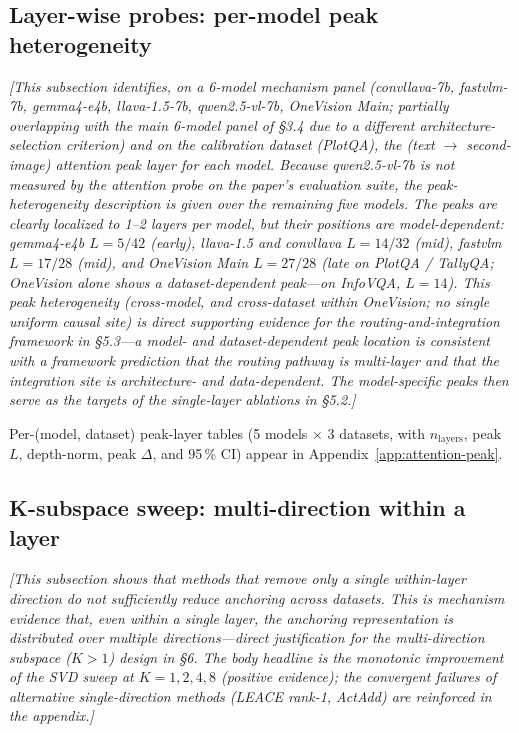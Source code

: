 \documentclass[11pt]{article}
\newcommand{\todoNote}[1]{\textit{\textcolor[rgb]{0.45,0.45,0.45}{[#1]}}}
\begin{document}
\subsection{Layer-wise probes: per-model peak heterogeneity}
\label{sec:layer-probes}
\todoNote{This subsection identifies, on a 6-model mechanism panel (convllava-7b, fastvlm-7b, gemma4-e4b, llava-1.5-7b, qwen2.5-vl-7b, OneVision Main; partially overlapping with the main 6-model panel of \S3.4 due to a different architecture-selection criterion) and on the calibration dataset (PlotQA), the (text $\rightarrow$ second-image) attention peak layer for each model. Because qwen2.5-vl-7b is not measured by the attention probe on the paper's evaluation suite, the peak-heterogeneity description is given over the remaining five models. The peaks are \textit{clearly localized to 1--2 layers per model, but their positions are model-dependent}: gemma4-e4b $L=5/42$ (early), llava-1.5 and convllava $L=14/32$ (mid), fastvlm $L=17/28$ (mid), and OneVision Main $L=27/28$ (late on PlotQA / TallyQA; \textit{OneVision alone shows a dataset-dependent peak}---on InfoVQA, $L=14$). This \textit{peak heterogeneity} (cross-model, and cross-dataset within OneVision; no single uniform causal site) is direct supporting evidence for the routing-and-integration framework in \S5.3---a model- and dataset-dependent peak location is consistent with a framework prediction that the routing pathway is multi-layer and that the integration site is architecture- and data-dependent. The model-specific peaks then serve as the targets of the single-layer ablations in \S5.2.}

Per-(model, dataset) peak-layer tables (5 models $\times$ 3 datasets, with $n_\text{layers}$, peak $L$, depth-norm, peak $\Delta$, and 95\,\% CI) appear in Appendix~\ref{app:attention-peak}.

\subsection{K-subspace sweep: multi-direction within a layer}
\label{sec:k-subspace}
\todoNote{This subsection shows that methods that remove only a single within-layer direction do not sufficiently reduce anchoring across datasets. This is mechanism evidence that, even within a single layer, the anchoring representation is distributed over multiple directions---direct justification for the \textit{multi-direction subspace} ($K>1$) design in \S6. The body headline is the monotonic improvement of the SVD sweep at $K = 1, 2, 4, 8$ (positive evidence); the convergent failures of alternative single-direction methods (LEACE rank-1, ActAdd) are reinforced in the appendix.}
\end{document}
